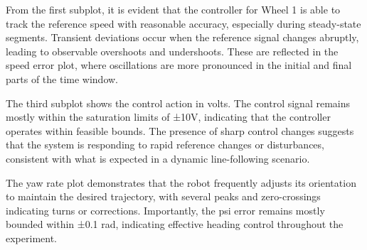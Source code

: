 From the first subplot, it is evident that the controller for Wheel 1 is able to track the reference speed with reasonable accuracy, especially during steady-state segments. 
Transient deviations occur when the reference signal changes abruptly, leading to observable overshoots and undershoots. 
These are reflected in the speed error plot, where oscillations are more pronounced in the initial and final parts of the time window.

The third subplot shows the control action in volts. 
The control signal remains mostly within the saturation limits of ±10V, indicating that the controller operates within feasible bounds. 
The presence of sharp control changes suggests that the system is responding to rapid reference changes or disturbances, consistent with what is expected in a dynamic line-following scenario.

The yaw rate plot demonstrates that the robot frequently adjusts its orientation to maintain the desired trajectory, with several peaks and zero-crossings indicating turns or corrections. 
Importantly, the psi error remains mostly bounded within ±0.1 rad, indicating effective heading control throughout the experiment.

